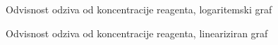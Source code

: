 \documentclass[a4paper,10pt]{article}
\begin{document}
\begin{figure}
 
  \caption{Odvisnost odziva od koncentracije reagenta, logaritemski graf}
  \label{fig:receptorji-log}
\end{figure}


\begin{figure}
 
  \caption{Odvisnost odziva od koncentracije reagenta, lineariziran graf}
  \label{fig:receptorji-lin}
\end{figure}


\end{document}
